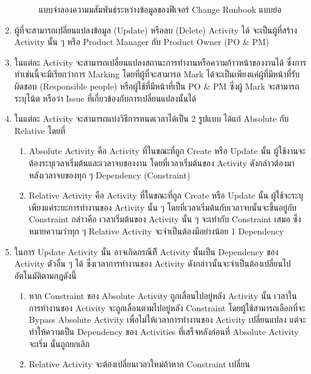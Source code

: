 \begin{enumerate}
\begin{figure}[H]
\begin{center}
        \end{center}
        \caption[แบบจำลองความมสัมพันธ์ระหว่างข้อมูลของฟีเจอร์ Change Runbook แบบย่อ]{แบบจำลองความมสัมพันธ์ระหว่างข้อมูลของฟีเจอร์ Change Runbook แบบย่อ}
        \label{fig:change-runbook-er}
    \end{figure}
    \item ผู้ที่จะสามารถเปลี่ยนแปลงข้อมูล (Update) หรือลบ (Delete) Activity ได้ จะเป็นผู้ที่สร้าง Activity นั้น ๆ หรือ Product Manager กับ Product Owner (PO \& PM)
    \item ในแต่ละ Activity จะสามารถเปลี่ยนแปลงสถานะการทำงานหรือความก้าวหน้าของงานได้ ซึ่งการทำเช่นนี้จะมีเรียกว่าการ Marking โดยที่ผู้ที่จะสามารถ Mark ได้จะเป็นเพียงแค่ผู้ที่มีหน้าที่รับผิดชอบ (Responsible people) หรือผู้ใช้ที่มีหน้าที่เป็น PO \& PM ซึ่งผู้ Mark จะสามารถระบุโน้ต หรือว่า Issue ที่เกี่ยวข้องกับการเปลี่ยนแปลงนั้นได้
    \item ในแต่ละ Activity จะสามารถแบ่งวิธีการหนดเวลาได้เป็น 2 รูปแบบ ได้แก่ Absolute กับ Relative โดยที่ 
    \begin{enumerate}
        \item Absolute Activity คือ Activity ที่ในขณะที่ถูก Create หรือ Update นั้น ผู้ใช้งานจะต้องระบุเวลาเริ่มต้นและเวลาจบของงาน โดยที่เวลาเริ่มต้นของ Activity ดังกล่าวต้องมาหลังเวลาจบของทุก ๆ Dependency (Constraint)
        \item Relative Activity คือ Activity ที่ในขณะที่ถูก Create หรือ Update นั้น ผู้ใช้จะระบุเพียงแค่ระยะการทำงานของ Activity นั้น ๆ โดยที่เวลาเริ่มต้นกับเวลาจบนั้นจะขึ้นอยู่กับ Constraint กล่าวคือ เวลาเริ่มต้นของ Activity นั้น ๆ จะเท่ากับ Constraint เสมอ ซึ่งหมายความว่าทุก ๆ Relative Activity จะจำเป็นต้องมีอย่างน้อย 1 Dependency
    \end{enumerate}
    \item ในการ Update Activity นั้น อาจเกิดกรณีทีี Activity นั้นเป็น Dependency ของ Activity ตัวอื่น ๆ ได้ ซึ่งเวลาการทำงานของ Activity ดังกล่าวนั้นจะจำเป็นต้องเปลี่ยนไปอัตโนมัติตามกฎดังนี้
    \begin{enumerate}
        \item หาก Constraint ของ Absolute Activity ถูกเลื่อนไปอยู่หลัง Activity นั้น เวลาในการทำงานของ Activity จะถูกเลื่อนตามไปอยู่หลัง Constraint โดยผู้ใช้สามารถเลือกที่จะ Bypass Absolute Activity เพื่อไม่ให้เวลาการทำงานของ Activity เปลี่ยนแปลง แต่จะทำให้ความเป็น Dependency ของ Activities ที่เสร็จหลังก่อนที่ Absolute Activity จะเริ่ม นั้นถูกยกเลิก 
        \item Relative Activity จะต้องเปลี่ยนเวลาใหม่ถ้าหาก Constraint เปลี่ยน
    \end{enumerate}
    \newcommand{\nabs}{$\langle \textrm{abs} \rangle$}
    \newcommand{\nrel}{$\langle \textrm{rel} \rangle$}


\end{enumerate}
